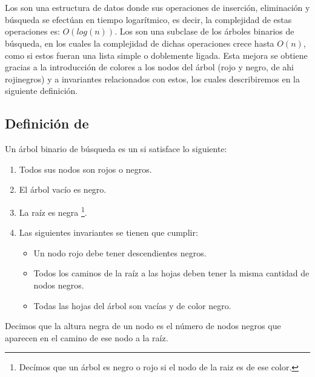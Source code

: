\section{\Arns}
Los {\arns} son una estructura de datos donde sus operaciones de inserci\'on, eliminaci\'on y
búsqueda se efectúan en tiempo logarítmico, es decir, la complejidad de estas operaciones es:
$O(log(n))$. Los {\arns} son una subclase de los \'arboles binarios de búsqueda, en los cuales la
complejidad de dichas operaciones crece hasta $O(n)$, como si estos fueran una lista simple o
doblemente ligada. Esta mejora se obtiene gracias a la introducción de colores a los nodos del
\'arbol (rojo y negro, de ahi rojinegros) y a invariantes relacionados con estos, los
cuales describiremos en la siguiente definici\'on.
\subsection{Definici\'on de {\arns}}
Un \'arbol binario de búsqueda es un {\arn} si satisface lo siguiente:
\begin{enumerate}
    \item Todos sus nodos son rojos o negros.
    \item El \'arbol vac\'io es negro.
    \item La ra\'iz es negra \footnote{Dec\'imos que un \'arbol es negro o rojo si el nodo de la
    raiz es de ese color.}.
    \item Las siguientes invariantes se tienen que cumplir:
    \begin{itemize}
        \item Un nodo rojo debe tener descendientes negros.
        \item Todos los caminos de la raíz a las hojas deben tener la misma cantidad de nodos
        negros.
        \item Todas las hojas del \'arbol son vacías y de color negro.
    \end{itemize}
\end{enumerate}
Decimos que la altura negra de un nodo es el n\'umero de nodos negros que aparecen en el camino de ese nodo a la raíz.

